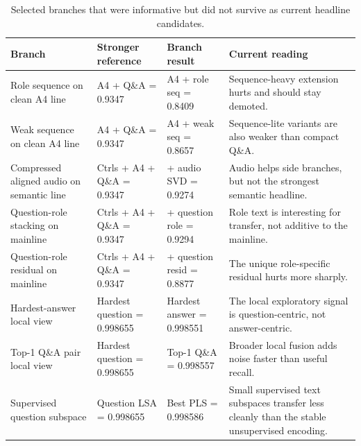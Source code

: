 
\begin{table}[t]
\footnotesize
\setlength{\tabcolsep}{3pt}
\caption{Selected branches that were informative but did not survive as current headline candidates.}
\label{tab:demoted-paths}
\begin{tabularx}{\columnwidth}{>{\raggedright\arraybackslash}p{}>{\raggedright\arraybackslash}p{}>{\raggedright\arraybackslash}p{}>{\raggedright\arraybackslash}X}
\toprule
Branch & Stronger reference & Branch result & Current reading \\
\midrule
Role sequence on clean A4 line & A4 + Q\&A = 0.9347 & A4 + role seq = 0.8409 & Sequence-heavy extension hurts and should stay demoted. \\
Weak sequence on clean A4 line & A4 + Q\&A = 0.9347 & A4 + weak seq = 0.8657 & Sequence-lite variants are also weaker than compact Q\&A. \\
Compressed aligned audio on semantic line & Ctrls + A4 + Q\&A = 0.9347 & + audio SVD = 0.9274 & Audio helps side branches, but not the strongest semantic headline. \\
Question-role stacking on mainline & Ctrls + A4 + Q\&A = 0.9347 & + question role = 0.9294 & Role text is interesting for transfer, not additive to the mainline. \\
Question-role residual on mainline & Ctrls + A4 + Q\&A = 0.9347 & + question resid = 0.8877 & The unique role-specific residual hurts more sharply. \\
Hardest-answer local view & Hardest question = 0.998655 & Hardest answer = 0.998551 & The local exploratory signal is question-centric, not answer-centric. \\
Top-1 Q\&A pair local view & Hardest question = 0.998655 & Top-1 Q\&A = 0.998557 & Broader local fusion adds noise faster than useful recall. \\
Supervised question subspace & Question LSA = 0.998655 & Best PLS = 0.998586 & Small supervised text subspaces transfer less cleanly than the stable unsupervised encoding. \\
\bottomrule
\end{tabularx}
\end{table}
